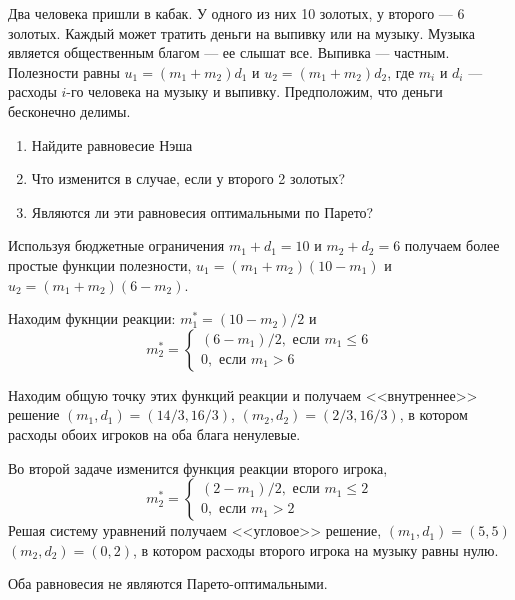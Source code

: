 \begin{problem}
Два человека пришли в кабак. У одного из них 10 золотых, у второго --- 6 золотых. Каждый может тратить деньги на выпивку или на музыку.
Музыка является общественным благом --- ее слышат все. Выпивка --- частным. Полезности равны $u_{1}=(m_{1}+m_{2})d_{1}$ и
$u_{2}=(m_{1}+m_{2})d_{2}$, где $m_{i}$ и $d_{i}$ --- расходы $i$-го
человека на музыку и выпивку. Предположим, что деньги бесконечно
делимы.
\begin{enumerate}
\item Найдите равновесие Нэша
\item Что изменится в случае, если у второго 2 золотых?
\item Являются ли эти равновесия оптимальными по Парето?
\end{enumerate}



\begin{sol}
Используя бюджетные ограничения $m_1+d_1=10$ и $m_2+d_2=6$ получаем более простые функции полезности, $u_1=(m_1+m_2)(10-m_1)$ и $u_2=(m_1+m_2)(6-m_2)$.

Находим фукнции реакции: $m_1^*=(10-m_2)/2$ и
\[
m_2^*=
\begin{cases}
(6-m_1)/2, \text{ если } m_1 \leq 6 \\
0, \text{ если } m_1 > 6
\end{cases}
\]

Находим общую точку этих функций реакции и получаем <<внутреннее>> решение $(m_1,d_1)=(14/3,16/3)$, $(m_2,d_2)=(2/3,16/3)$, в котором расходы обоих игроков на оба блага ненулевые.

Во второй задаче изменится функция реакции второго игрока,
\[
m_2^*=
\begin{cases}
(2-m_1)/2, \text{ если } m_1 \leq 2 \\
0, \text{ если } m_1 > 2
\end{cases}
\]
Решая систему уравнений получаем <<угловое>> решение, $(m_1,d_1)=(5,5)$ $(m_2,d_2)=(0,2)$, в котором расходы второго игрока на музыку равны нулю.

Оба равновесия не являются Парето-оптимальными.
\end{sol}
\end{problem}


